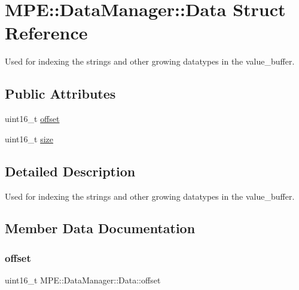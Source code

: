 \hypertarget{struct_m_p_e_1_1_data_manager_1_1_data}{}\section{M\+PE\+:\+:Data\+Manager\+:\+:Data Struct Reference}
\label{struct_m_p_e_1_1_data_manager_1_1_data}


Used for indexing the strings and other growing datatypes in the value\+\_\+buffer.  


\subsection*{Public Attributes}
\begin{DoxyCompactItemize}
\item 
uint16\+\_\+t \hyperlink{struct_m_p_e_1_1_data_manager_1_1_data_a453a2aeeef871f6d9d7d9fb8c1f74f05}{offset}
\item 
uint16\+\_\+t \hyperlink{struct_m_p_e_1_1_data_manager_1_1_data_af32b0baab1caac2b8398e75bc50a5f90}{size}
\end{DoxyCompactItemize}


\subsection{Detailed Description}
Used for indexing the strings and other growing datatypes in the value\+\_\+buffer. 

\subsection{Member Data Documentation}
\mbox{\label{struct_m_p_e_1_1_data_manager_1_1_data_a453a2aeeef871f6d9d7d9fb8c1f74f05}} 
\subsubsection{\texorpdfstring{offset}{offset}}
{\footnotesize\ttfamily uint16\+\_\+t M\+P\+E\+::\+Data\+Manager\+::\+Data\+::offset}

\mbox{\label{struct_m_p_e_1_1_data_manager_1_1_data_af32b0baab1caac2b8398e75bc50a5f90}} 
